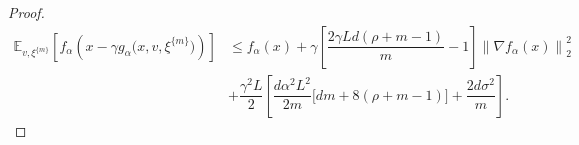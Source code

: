 \documentclass[10pt,a4paper]{amsart}
\newcommand{\Ec}[2]{\mathbb{E}_{#2}\left[#1 \right]}
\newcommand{\norm}[1]{\left\lVert#1\right\rVert_{2}}
\def\xiest{{\xi^{\{m\}}}}
\begin{document}
\begin{proof}
\begin{equation*}
    \begin{aligned}
        \Ec{f_\alpha\left(x - \gamma g_{\alpha}\Big(x,v,\xiest\Big)\right)}{v,\xiest}
        &\leq f_\alpha(x)+ \gamma\left[\dfrac{2\gamma Ld(\rho+m-1)}{m}-1\right]\norm{\nabla f_\alpha(x)}^2\\
        &+\dfrac{\gamma^2L}{2}\left[\dfrac{d\alpha^2L^2}{2m}\Big[dm+8(\rho+m-1)\Big]+\dfrac{2d\sigma^2}{m}\right].
    \end{aligned}
\end{equation*}
$ $
\end{proof}
\end{document}
